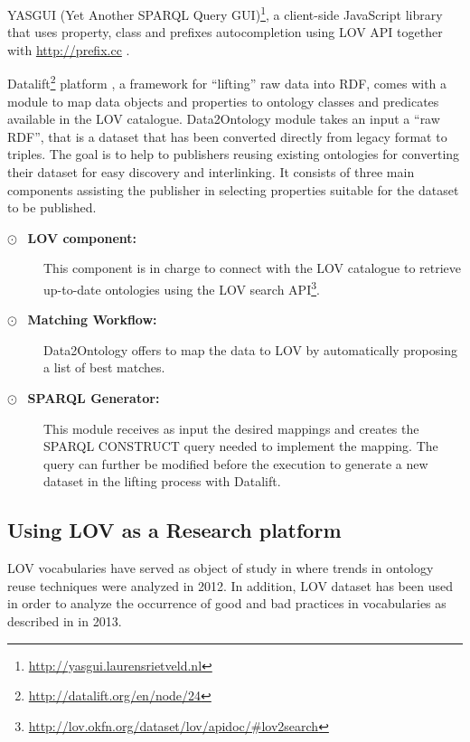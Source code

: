 \documentclass{iosart2c}
\newcommand{\maria}[1]{\textcolor{blue}{\textbf{[MARIA TO:#1]}}}
\begin{document}
YASGUI (Yet Another SPARQL Query GUI)\footnote{\url{http://yasgui.laurensrietveld.nl}}, a client-side JavaScript library that uses property, class and prefixes autocompletion using LOV API together with \url{http://prefix.cc} \cite{yasgui}.

Datalift\footnote{\url{http://datalift.org/en/node/24}} platform \cite{scharffe_2012}, a framework for ``lifting'' raw data into RDF, comes with a module to map data objects and properties to ontology classes and predicates available in the LOV catalogue. Data2Ontology module takes an input a ``raw RDF'', that is a dataset that has been converted directly from legacy format to triples. The goal is to help to publishers reusing existing ontologies for converting their dataset for easy discovery and interlinking. It consists of three main components assisting the publisher in selecting properties suitable for the dataset to be published. 
\begin{description}
\item[$\odot$~ \textbf{LOV component:}] This component is in charge to connect with the LOV catalogue to retrieve up-to-date ontologies using the LOV search API\footnote{\url{http://lov.okfn.org/dataset/lov/apidoc/\#lov2search}}.
\item[$\odot$~ \textbf{Matching Workflow:}] Data2Ontology offers to map the data to LOV by automatically proposing a list of best matches.

 \item[$\odot$~ \textbf{SPARQL Generator:}] This module receives as input the desired mappings and creates the SPARQL CONSTRUCT query needed to implement the mapping. The query can further be modified before the execution to generate a new dataset in the lifting process with Datalift.
 \end{description}

\subsection{Using LOV as a Research platform}

LOV vocabularies have served as object of study in \cite{poveda2012landscape} where trends in ontology reuse techniques were analyzed in 2012. In addition, LOV dataset has been used in order to analyze the occurrence of good and bad practices in vocabularies as described in \cite{poveda2013detecting} in 2013.
\end{document}
